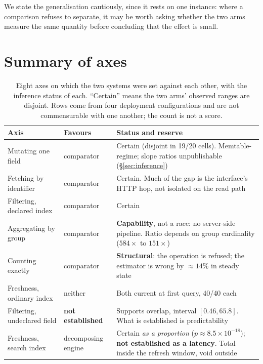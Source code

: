 \documentclass[11pt,a4paper]{article}
\begin{document}
We state the generalisation cautiously, since it rests on one instance: where a comparison refuses
to separate, it may be worth asking whether the two arms measure the same quantity before concluding
that the effect is small.

\section{Summary of axes}
\label{sec:summary}

\begin{table}[htbp]
\centering
\small
\caption{Eight axes on which the two systems were set against each other, with the inference status
of each. ``Certain'' means the two arms' observed ranges are disjoint. Rows come from four
deployment configurations and are not commensurable with one another; the count is not a score.}
\label{tab:axes}
\begin{tabular}{p{4.6cm}p{2.5cm}p{7.2cm}}
\toprule
\textbf{Axis} & \textbf{Favours} & \textbf{Status and reserve} \\
\midrule
Mutating one field & comparator & Certain (disjoint in 19/20 cells). Memtable-regime; slope ratios
unpublishable (\S\ref{sec:inference}) \\
Fetching by identifier & comparator & Certain. Much of the gap is the interface's HTTP hop, not
isolated on the read path \\
Filtering, declared index & comparator & Certain \\
Aggregating by group & comparator & \textbf{Capability}, not a race: no server-side pipeline. Ratio
depends on group cardinality ($584\times$ to $151\times$) \\
Counting exactly & comparator & \textbf{Structural}: the operation is refused; the estimator is
wrong by $\approx 14\%$ in steady state \\
Freshness, ordinary index & neither & Both current at first query, 40/40 each \\
Filtering, undeclared field & \textbf{not established} & Supports overlap, interval $[0.46, 65.8]$.
What is established is predictability \\
Freshness, search index & decomposing engine & Certain \emph{as a proportion}
($p \approx 8.5\times10^{-18}$); \textbf{not established as a latency}. Total inside the refresh
window, void outside \\
\bottomrule
\end{tabular}
\end{table}
\end{document}
